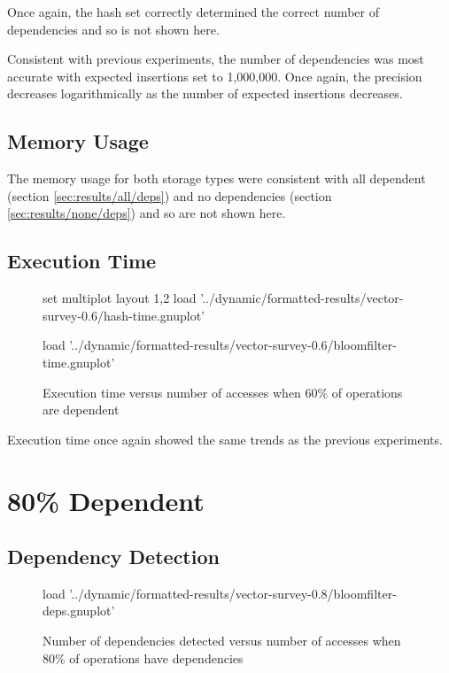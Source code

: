 	Once again, the hash set correctly determined the correct number of dependencies and so is not shown here.
		
	Consistent with previous experiments, the number of dependencies was most accurate with expected insertions set to 1,000,000. Once again, the precision decreases logarithmically as the number of expected insertions decreases.
	
	\subsection{Memory Usage} \label{sec:results/60/mem}
	The memory usage for both storage types were consistent with all dependent (section \ref{sec:results/all/deps}) and no dependencies (section \ref{sec:results/none/deps}) and so are not shown here.
	
	\subsection{Execution Time} \label{sec:results/60/time}
	\begin{figure}
		\centering
		\begin{gnuplot}[terminal=pdf]
			set multiplot layout 1,2
				load '../dynamic/formatted-results/vector-survey-0.6/hash-time.gnuplot'
				
				load '../dynamic/formatted-results/vector-survey-0.6/bloomfilter-time.gnuplot'
		\end{gnuplot}
		\caption{Execution time versus number of accesses when 60\% of operations are dependent}
		\label{chart:60-time}
	\end{figure}
	
	Execution time once again showed the same trends as the previous experiments.
	
\section{80\% Dependent} \label{sec:results/80}
\subsection{Dependency Detection} \label{sec:results/80/deps}
	\begin{figure}
		\centering
		\begin{gnuplot}[terminal=pdf]
			load '../dynamic/formatted-results/vector-survey-0.8/bloomfilter-deps.gnuplot'
		\end{gnuplot}
		\caption{Number of dependencies detected versus number of accesses when 80\% of operations have dependencies}
		\label{chart:80-dep}
	\end{figure}
	
